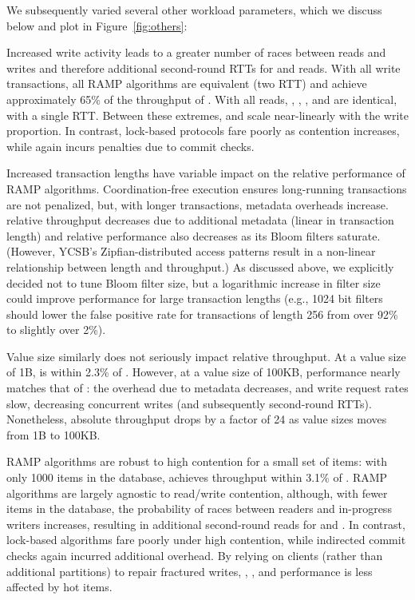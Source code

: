 We subsequently varied several other workload parameters, which we
discuss below and plot in Figure~\ref{fig:others}:

 Increased write activity leads to a greater
number of races between reads and writes and therefore additional
second-round RTTs for \rapl and \rapb reads. With all write
transactions, all RAMP algorithms are equivalent (two RTT) and achieve
approximately 65\% of the throughput of \nwnr. With all reads, \rapl,
\raps, \nwnr, and \mstr are identical, with a single RTT. Between
these extremes, \rapl and \raps scale near-linearly with the write
proportion. In contrast, lock-based protocols fare poorly as
contention increases, while \mstr again incurs penalties due to commit
checks.


 Increased transaction lengths have
variable impact on the relative performance of RAMP
algorithms. Coordination-free execution ensures long-running
transactions are not penalized, but, with longer transactions,
metadata overheads increase. \rapl relative throughput decreases due
to additional metadata (linear in transaction length) and \rapb
relative performance also decreases as its Bloom filters
saturate. (However, YCSB's Zipfian-distributed access patterns result
in a non-linear relationship between length and throughput.) As
discussed above, we explicitly decided not to tune \rapb Bloom filter
size, but a logarithmic increase in filter size could improve \rapb
performance for large transaction lengths (e.g., 1024 bit filters
should lower the false positive rate for transactions of length 256
from over 92\% to slightly over 2\%).

 Value size similarly does not seriously impact
relative throughput. At a value size of 1B, \rapl is within 2.3\% of
\nwnr. However, at a value size of 100KB, \rapl performance nearly
matches that of \nwnr: the overhead due to metadata decreases, and
write request rates slow, decreasing concurrent writes (and
subsequently second-round RTTs). Nonetheless, absolute throughput
drops by a factor of 24 as value sizes moves from 1B to 100KB\@.

 RAMP algorithms are robust to high contention
for a small set of items: with only 1000 items in the database, \rapl
achieves throughput within 3.1\% of \nwnr. RAMP algorithms are
largely agnostic to read/write contention, although, with fewer items
in the database, the probability of races between readers and
in-progress writers increases, resulting in additional second-round
reads for \rapl and \rapb. In contrast, lock-based algorithms fare
poorly under high contention, while \mstr indirected commit checks
again incurred additional overhead. By relying on clients (rather than
additional partitions) to repair fractured writes, \rapl, \rapb, and
\raps performance is less affected by hot items. \vspace{.5em}

